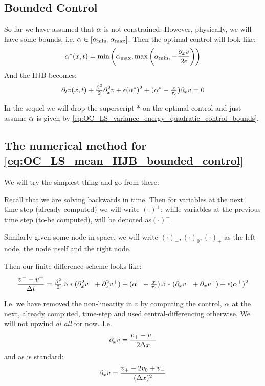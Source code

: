 \documentclass{article}
\begin{document}
\subsection{Bounded Control}
So far we have assumed that ${\alpha}$ is not constrained. However, physically, we
will have some bounds, i.e. ${\alpha} \in [{ {\alpha}_{\textrm{min}} }, { {\alpha}_{\textrm{max}} }]$. Then the optimal control
will look like:
\begin{equation}
{ {\alpha}^* }(x,t) = \min \left({ {\alpha}_{\textrm{max}} }, \max\left({ {\alpha}_{\textrm{min}} }, -\frac{{\partial}_x v}{2{\epsilon}}\right)
\right)
\label{eq:OC_LS_variance_energy_quadratic_control_bounds}
\end{equation}
And the HJB becomes:
\begin{equation}
{\partial}_t v(x,t) + \tfrac{{\beta}^2}{2} {\partial}_x^2 v + 
{\epsilon} ({ {\alpha}^* })^2 + ({ {\alpha}^* }-\tfrac{x}{{ \tau_{c} }}) {\partial}_x v 
= 0
\label{eq:OC_LS_mean_HJB_bounded_control}
\end{equation}

In the sequel we will drop the superscript $*$ on the optimal control and just
assume ${\alpha}$ is given by
\cref{eq:OC_LS_variance_energy_quadratic_control_bounds}.

\subsection{The numerical method for
\cref{eq:OC_LS_mean_HJB_bounded_control}}
 We will try the simplest thing and go from there:

Recall that we are solving backwards in time. Then for variables at the next
time-step (already computed) we will write $(\cdot)^+$; while variables at the
previous time step (to-be computed), will be denoted as$(\cdot)^-$.

Similarly given some node in space, we will write
$(\cdot)_-,(\cdot)_0,(\cdot)_+$ as the left node, the node itself and the right
node.

Then our finite-difference scheme looks like:
\begin{equation}
\frac{v^- - v^+}{\Delta t} = \tfrac{{\beta}^2}2  .5*({\partial}_x^2 v^- + {\partial}_x^2 v^+) +
({\alpha}^+ - \tfrac{x}{{ \tau_{c} }})  .5*({\partial}_x v^- + {\partial}_x v^+) + {\epsilon} ({\alpha} ^+)^2
\end{equation}

I.e. we have removed the non-linearity in $v$ by computing the control, ${\alpha}$ at
the next, already computed, time-step and used central-differencing
otherwise. We will not upwind \emph{al all} for now\ldots I.e. 
$${\partial}_x v = \frac{v_+ - v_-}{2\Delta x}$$
and as is standard:
$${\partial}_x v = \frac{v_+ - 2 v_0 + v_-}{(\Delta x)^2}$$
\end{document}
